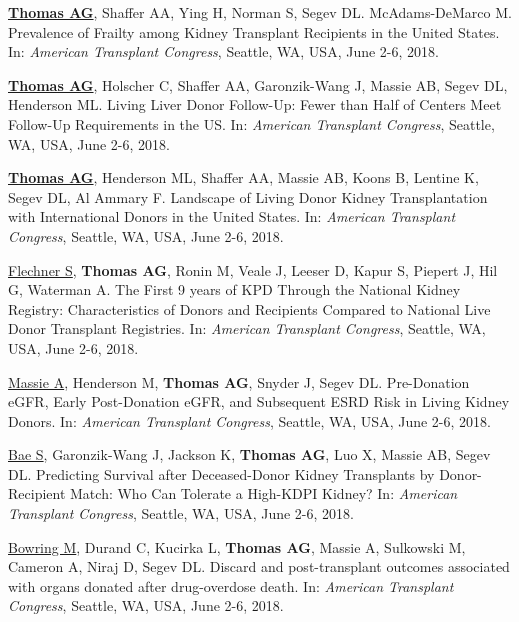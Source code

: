 \documentclass[10pt]{article}
\makeatletter
\newlength{\bibhang}
\newlength{\bibsep}
 {\@listi \global\bibsep\itemsep \global\advance\bibsep by\parsep}
\newenvironment{bibenum*}
  {\renewcommand\labelenumi{[\theenumi]}%
   \etaremune[
     topsep=0pt,
     itemsep=\bibsep,
     parsep=0pt,partopsep=0pt,
     itemindent=-\bibhang,
     leftmargin={\bibhang+\widthof{[999]}}]}
  {\endetaremune}
\makeatother
\begin{document}
\vspace{2mm}

\begin{bibenum*}

\item \underline{\textbf{Thomas AG}}, Shaffer AA, Ying H, Norman S,
  Segev DL. McAdams-DeMarco M.
  Prevalence of Frailty among Kidney Transplant Recipients in the United States.
  In: \emph{American Transplant Congress},
  Seattle, WA, USA, June 2-6, 2018.

\item \underline{\textbf{Thomas AG}}, Holscher C, Shaffer AA,
  Garonzik-Wang J, Massie AB, Segev DL, Henderson ML.
  Living Liver Donor Follow-Up: Fewer than Half of
  Centers Meet Follow-Up Requirements in the US.
  In: \emph{American Transplant Congress},
  Seattle, WA, USA, June 2-6, 2018.

\item \underline{\textbf{Thomas AG}}, Henderson ML, Shaffer AA,
  Massie AB, Koons B, Lentine K, Segev DL, Al Ammary F.
  Landscape of Living Donor Kidney Transplantation with
  International Donors in the United States.
  In: \emph{American Transplant Congress},
  Seattle, WA, USA, June 2-6, 2018.

\item \underline{Flechner S}, \textbf{Thomas AG}, Ronin M,
  Veale J, Leeser D, Kapur S, Piepert J, Hil G, Waterman A.
  The First 9 years of KPD Through the National Kidney Registry:
  Characteristics of Donors and Recipients Compared to
  National Live Donor Transplant Registries.
  In: \emph{American Transplant Congress},
  Seattle, WA, USA, June 2-6, 2018.

\item \underline{Massie A}, Henderson M, \textbf{Thomas AG},
  Snyder J, Segev DL. Pre-Donation eGFR, Early Post-Donation eGFR,
  and Subsequent ESRD Risk in Living Kidney Donors.
  In: \emph{American Transplant Congress},
  Seattle, WA, USA, June 2-6, 2018.

\item \underline{Bae S}, Garonzik-Wang J, Jackson K, \textbf{Thomas AG},
  Luo X, Massie AB, Segev DL.
  Predicting Survival after Deceased-Donor Kidney Transplants by
  Donor-Recipient Match: Who Can Tolerate a High-KDPI Kidney?
  In: \emph{American Transplant Congress},
  Seattle, WA, USA, June 2-6, 2018.

\item \underline{Bowring M}, Durand C, Kucirka L, \textbf{Thomas AG},
  Massie A, Sulkowski M, Cameron A, Niraj D, Segev DL.
  Discard and post-transplant outcomes associated with organs
  donated after drug-overdose death.
  In: \emph{American Transplant Congress},
  Seattle, WA, USA, June 2-6, 2018.


\end{bibenum*}
\end{document}
